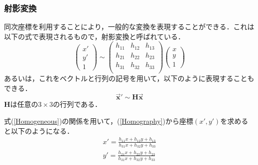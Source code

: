 \documentclass[openright]{nitocs}
\numberwithin{equation}{section}
\begin{document}
            \subsubsection{射影変換}
                同次座標を利用することにより，一般的な変換を表現することができる．これは以下の式で表現されるもので，射影変換と呼ばれている．
                \begin{equation} %
                    \left(
                        \begin{array}{ccc}
                        x'\\
                        y'\\
                        1
                        \end{array}
                    \right)\sim
                    \left(
                        \begin{array}{ccc}
                        h_{11} & h_{12} & h_{13}\\
                        h_{21} & h_{22} & h_{23}\\
                        h_{31} & h_{32} & h_{33}\\
                        \end{array}
                    \right)
                    \left(
                        \begin{array}{ccc}
                        x\\
                        y\\
                        1
                        \end{array}
                    \right)
                    \label{Homography}
                \end{equation}
                あるいは，これをベクトルと行列の記号を用いて，以下のように表現することもできる．
                \begin{equation}
                    \bm{\vec{x}'} \sim \bm{H\vec{x}}
                \end{equation}
                $\bm{H}$は任意の$3\times3$の行列である．

                式(\ref{Homogeneous})の関係を用いて，(\ref{Homography})から座標$(x',y')$を求めると以下のようになる．
                \begin{equation} %
                    \begin{split} %
                        x' = \frac{h_{11}x+h_{12}y+h_{13}}{h_{31}x+h_{32}y+h_{33}} \\ 
                        y' = \frac{h_{21}x+h_{22}y+h_{23}}{h_{31}x+h_{32}y+h_{33}} \\ 
                    \end{split}
                \end{equation}
\end{document}
